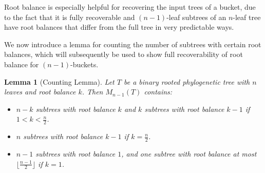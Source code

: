 \documentclass[12pt]{article}
\newtheorem{Lemma}[Theorem]{Lemma}
\theoremstyle{definition}
\begin{document}
Root balance is especially helpful for recovering the input trees of a bucket, due to the fact that it is fully recoverable and $(n-1)$-leaf subtrees of an $n$-leaf tree have root balances that differ from the full tree in very predictable ways. 

We now introduce a lemma for counting the number of subtrees with certain root balances, which will subsequently be used to show full recoverability of root balance for $(n-1)$-buckets.

\begin{Lemma}[Counting Lemma]\label{unlabelled_buckets_counting}
    Let $T$ be a binary rooted phylogenetic tree with $n$ leaves and root balance $k$. Then $M_{n-1}(T)$ contains:
    \begin{itemize}
        \item $n-k$ subtrees with root balance $k$ and $k$ subtrees with root balance $k-1$ if $1<k<\frac{n}{2}$.
        \item $n$ subtrees with root balance $k-1$ if $k=\frac{n}{2}$.
        \item $n-1$ subtrees with root balance $1$, and one subtree with root balance at most $\lfloor\frac{n-1}{2}\rfloor$ if $k=1$.
    \end{itemize}
\end{Lemma}
\end{document}
